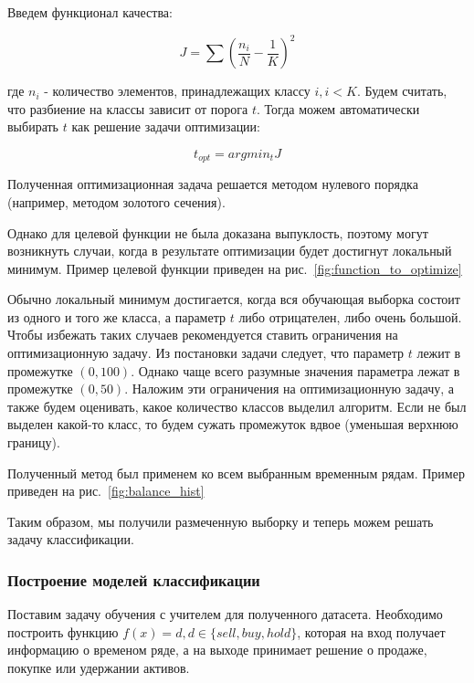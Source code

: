 \documentclass[a4paper,article,14pt]{extarticle}
\begin{document}
Введем функционал качества:

\begin{equation}
    J=\sum{(\frac{n_i}{N} - \frac{1}{K}) ^ 2}
    \label{eq:error_func}
\end{equation}

где $n_i$ - количество элементов, принадлежащих классу $i, i < K$.
Будем считать, что разбиение на классы зависит от порога $t$.
Тогда можем автоматически выбирать $t$ как решение задачи оптимизации:

\begin{equation}
    t_{opt} = argmin_t J
    \label{eq:equation4}
\end{equation}

Полученная оптимизационная задача решается методом нулевого порядка (например, методом золотого сечения).

Однако для целевой функции не была доказана выпуклость, поэтому могут возникнуть случаи, когда в результате оптимизации будет достигнут локальный минимум.
Пример целевой функции приведен на рис.~\ref{fig:function_to_optimize}



Обычно локальный минимум достигается, когда вся обучающая выборка состоит из одного и того же класса, а параметр $t$ либо отрицателен, либо очень большой.
Чтобы избежать таких случаев рекомендуется ставить ограничения на оптимизационную задачу.
Из постановки задачи следует, что параметр $t$ лежит в промежутке $(0, 100)$.
Однако чаще всего разумные значения параметра лежат в промежутке $(0, 50)$.
Наложим эти ограничения на оптимизационную задачу, а также будем оценивать, какое количество классов выделил алгоритм.
Если не был выделен какой-то класс, то будем сужать промежуток вдвое (уменьшая верхнюю границу).

\par
Полученный метод был применем ко всем выбранным временным рядам.
Пример приведен на рис.~\ref{fig:balance_hist}



Таким образом, мы получили размеченную выборку и теперь можем решать задачу классификации.

\subsubsection{Построение моделей классификации}

Поставим задачу обучения с учителем для полученного датасета.
Необходимо построить функцию $f(x)=d, d \in \{sell, buy, hold\}$, которая на вход получает информацию о временом ряде, а на выходе принимает решение о продаже, покупке или удержании активов.
\end{document}
